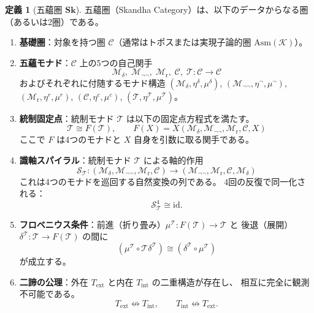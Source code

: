 \documentclass[11pt,a4paper]{article}
\theoremstyle{definition}
\newtheorem{definition}{定義}[section]
\newcommand{\Sk}{\mathbf{Sk}}
\newcommand{\id}{\mathrm{id}}
\newcommand{\Asm}{\mathrm{Asm}}
\newcommand{\Mdelta}{\mathcal{M}_{\delta}}
\newcommand{\Mneg}{\mathcal{M}_{\neg\neg}}
\newcommand{\Mr}{\mathcal{M}_{\mathrm{r}}}
\newcommand{\Mc}{\mathcal{C}}
\newcommand{\T}{\mathcal{T}}
\newcommand{\SpiralT}{\mathcal{S}_{\mathcal{T}}}
\newcommand{\fold}{\mu}
\newcommand{\unfold}{\delta}
\newcommand{\ext}{\mathrm{ext}}
\newcommand{\intn}{\mathrm{int}}
\newcommand{\TExt}{T_{\ext}}
\newcommand{\TInt}{T_{\intn}}
\begin{document}
\begin{definition}[五蘊圏 $\Sk$]\label{def:skandha}
五蘊圏（Skandha Category）は、以下のデータからなる圏（あるいは2圏）である。
\begin{enumerate}[label=(\arabic*)]
\item \textbf{基礎圏}：対象を持つ圏 $\mathcal{C}$（通常はトポスまたは実現子論的圏 $\Asm(\mathcal{K})$）。
\item \textbf{五蘊モナド}：$\mathcal{C}$ 上の5つの自己関手
  \begin{equation}
  \Mdelta,\; \Mneg,\; \Mr,\; \Mc,\; \T : \mathcal{C} \to \mathcal{C}
  \end{equation}
  およびそれぞれに付随するモナド構造
  $(\Mdelta, \eta^\delta, \mu^\delta)$,
  $(\Mneg, \eta^\neg, \mu^\neg)$,
  $(\Mr, \eta^r, \mu^r)$,
  $(\Mc, \eta^c, \mu^c)$,
  $(\T, \eta^\T, \mu^\T)$。
\item \textbf{統制固定点}：統制モナド $\T$ は以下の固定点方程式を満たす。
  \begin{equation}
  \T \cong F(\T), \qquad F(X) = X(\Mdelta, \Mneg, \Mr, \Mc, X)
  \label{eq:fixed-point}
  \end{equation}
  ここで $F$ は4つのモナドと $X$ 自身を引数に取る関手である。
\item \textbf{識軸スパイラル}：統制モナド $\T$ による軸的作用
  \begin{equation}
  \SpiralT : (\Mdelta, \Mneg, \Mr, \Mc) \longrightarrow 
             (\Mneg, \Mr, \Mc, \Mdelta)
  \label{eq:spiral}
  \end{equation}
  これは4つのモナドを巡回する自然変換の列である。
  4回の反復で同一化される：
  \begin{equation}
  \SpiralT^4 \cong \id.
  \end{equation}
\item \textbf{フロベニウス条件}：前進（折り畳み）$\fold^\T : F(\T) \to \T$ と
  後退（展開）$\unfold^\T : \T \to F(\T)$ の間に
  \begin{equation}
  (\fold^\T \circ \T\unfold^\T) \cong (\unfold^\T \circ \fold^\T)
  \label{eq:frobenius}
  \end{equation}
  が成立する。
\item \textbf{二諦の公理}：外在 $\TExt$ と内在 $\TInt$ の二重構造が存在し、
  相互に完全に観測不可能である。
  \begin{equation}
  \TExt \not\leftrightarrow \TInt, \qquad
  \TInt \not\leftrightarrow \TExt.
  \end{equation}
\end{enumerate}
\end{definition}
\end{document}
